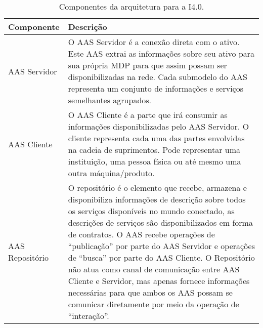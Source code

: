 \begin{table}[htb]
	\centering
	\begin{tabular}{p{3cm}p{12cm}}
		\hline
		\textbf{Componente}
		 & \textbf{Descrição}                                                                                                                                                                                                                                                                                                                                                                                                                                                                                                                                                  \\

		\hline
		AAS Servidor
		 & O AAS Servidor é a conexão direta com o ativo. Este AAS extrai as informações sobre seu ativo para sua própria MDP para que assim possam ser disponibilizadas na rede. Cada submodelo do AAS representa um conjunto de informações e serviços semelhantes agrupados.                                                                                                                                                                                                                                                                                                \\

		\hline
		AAS Cliente
		 & O AAS Cliente é a parte que irá consumir as informações disponibilizadas pelo AAS Servidor. O cliente representa cada uma das partes envolvidas na cadeia de suprimentos. Pode representar uma instituição, uma pessoa física ou até mesmo uma outra máquina/produto.                                                                                                                                                                                                                                                                                               \\

		\hline
		AAS Repositório
		 & O repositório é o elemento que recebe, armazena e disponibiliza informações de descrição sobre todos os serviços disponíveis no mundo conectado, as descrições de serviços são disponibilizados em forma de contratos. O AAS recebe operações de ``publicação'' por parte do AAS Servidor e operações de ``busca'' por parte do AAS Cliente. O Repositório não atua como canal de comunicação entre AAS Cliente e Servidor, mas apenas fornece informações necessárias para que ambos os AAS possam se comunicar diretamente por meio da operação de ``interação''. \\

		\hline
	\end{tabular}
	\caption{Componentes da arquitetura para a I4.0.}
	\label{tab:componentes-ws}
\end{table}

